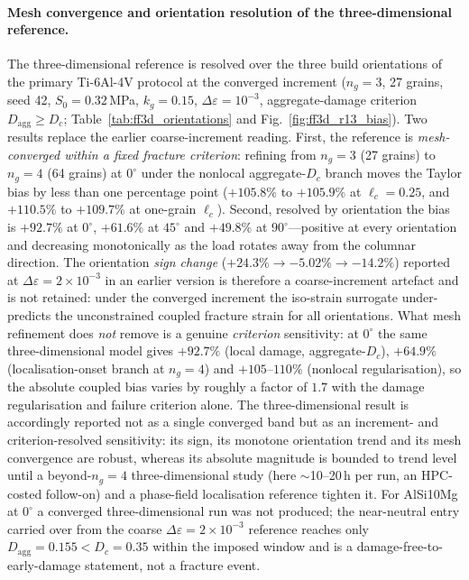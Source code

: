 \documentclass[12pt,a4paper,twocolumn]{article}
\providecommand{\ang}[1]{\ensuremath{#1^{\circ}}}
\begin{document}
\paragraph{Mesh convergence and orientation resolution of the three-dimensional reference.}
The three-dimensional reference is resolved over the three build orientations of the primary Ti-6Al-4V
protocol at the converged increment ($n_g=3$, 27 grains, seed 42, $S_0=0.32$\,MPa, $k_g=0.15$,
$\Delta\varepsilon=10^{-3}$, aggregate-damage criterion $D_{\mathrm{agg}}\ge D_c$;
Table~\ref{tab:ff3d_orientations} and Fig.~\ref{fig:ff3d_r13_bias}). Two results replace the earlier
coarse-increment reading. First, the reference is \emph{mesh-converged within a fixed fracture criterion}:
refining from $n_g=3$ (27 grains) to $n_g=4$ (64 grains) at $\ang{0}$ under the nonlocal aggregate-$D_c$
branch moves the Taylor bias by less than one percentage point ($+105.8\%$ to $+105.9\%$ at
$\ell_c=0.25$, and $+110.5\%$ to $+109.7\%$ at one-grain $\ell_c$). Second, resolved by orientation the
bias is $+92.7\%$ at $\ang{0}$, $+61.6\%$ at $\ang{45}$ and $+49.8\%$ at $\ang{90}$---positive at every
orientation and decreasing monotonically as the load rotates away from the columnar direction. The
orientation \emph{sign change} ($+24.3\%\to-5.02\%\to-14.2\%$) reported at $\Delta\varepsilon=2\times10^{-3}$
in an earlier version is therefore a coarse-increment artefact and is not retained: under the converged
increment the iso-strain surrogate under-predicts the unconstrained coupled fracture strain for all
orientations. What mesh refinement does \emph{not} remove is a genuine \emph{criterion} sensitivity: at
$\ang{0}$ the same three-dimensional model gives $+92.7\%$ (local damage, aggregate-$D_c$), $+64.9\%$
(localisation-onset branch at $n_g=4$) and $+105$--$110\%$ (nonlocal regularisation), so the absolute
coupled bias varies by roughly a factor of $1.7$ with the damage regularisation and failure criterion
alone. The three-dimensional result is accordingly reported not as a single converged band but as an
increment- and criterion-resolved sensitivity: its sign, its monotone orientation trend and its mesh
convergence are robust, whereas its absolute magnitude is bounded to trend level until a beyond-$n_g=4$
three-dimensional study (here $\sim$10--20\,h per run, an HPC-costed follow-on) and a phase-field
localisation reference tighten it. For AlSi10Mg at $\ang{0}$ a converged three-dimensional run was not
produced; the near-neutral entry carried over from the coarse $\Delta\varepsilon=2\times10^{-3}$ reference
reaches only $D_{\mathrm{agg}}=0.155<D_c=0.35$ within the imposed window and is a
damage-free-to-early-damage statement, not a fracture event.
\end{document}
